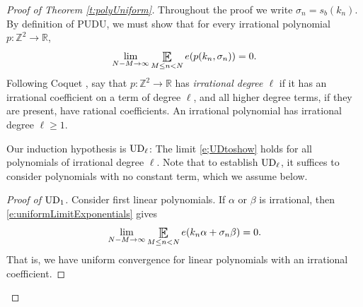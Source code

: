 \begin{proof}[Proof of Theorem \ref{t:polyUniform}] 
Throughout the proof we write $\sigma_n=s_b(k_n)$. 
By definition of PUDU, we must show that for every irrational polynomial $p\colon \mathbb{Z}^2\to\mathbb{R}$, 
\begin{equation}  \label{e;UDtoshow}
\lim_{N-M\to \infty} \Expectation_{M\leq n<N} 
e(p(k_n, \sigma_n)) =0. 
\end{equation}
Following Coquet \cite{MR506123}, 
say that $p \colon \mathbb{Z} ^2 \to \mathbb{R} $ has \emph{irrational degree $\ell$} 
if it has an irrational coefficient on a term of degree $\ell$, and all higher degree terms, if they are present, have  rational coefficients.  
An irrational polynomial has irrational degree $\ell\geq 1$. 

Our induction hypothesis is $\textup{UD} _{\ell}$:  The limit \eqref{e;UDtoshow} holds for all polynomials of irrational degree $\ell$.
  Note that to establish $\textup{UD} _{\ell}$, it suffices to consider polynomials with no constant term, which we assume below.   

\begin{proof}[Proof of $\textup{UD} _{1}$]
Consider first linear polynomials. If $\alpha$ or $\beta$ is irrational, then 
\eqref{e:uniformLimitExponentials} gives
\begin{equation} \label{e:deltaProgressions} 
\lim _{N-M\to \infty} \Expectation 
_{ M\leq n<N } 
e(k_n \alpha + \sigma_n\beta )=0.  
\end{equation}
That is, we have uniform convergence  for linear polynomials with an irrational coefficient.  


\end{proof}
\end{proof}
